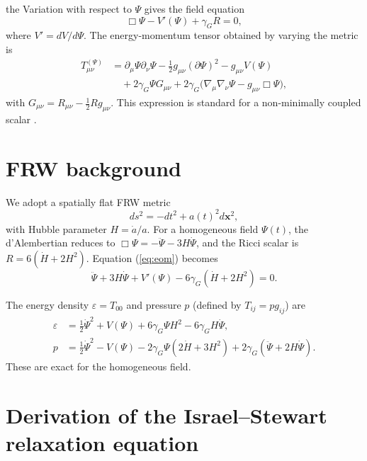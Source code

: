 \documentclass[aps,prd,reprint,superscriptaddress,floatfix]{revtex4-2}
\begin{document}
the Variation with respect to $\Psi$ gives the field equation
\begin{equation}
\Box\Psi - V'(\Psi) + \gamma_G R = 0,
\label{eq:eom}
\end{equation}
where $V' = dV/d\Psi$. The energy-momentum tensor obtained by varying the metric is
\begin{equation}
\begin{aligned}
T_{\mu\nu}^{(\Psi)} &= \partial_\mu\Psi\partial_\nu\Psi - \frac12 g_{\mu\nu}(\partial\Psi)^2 - g_{\mu\nu}V(\Psi) \\
&\quad + 2\gamma_G\Psi G_{\mu\nu} + 2\gamma_G\big( \nabla_\mu\nabla_\nu\Psi - g_{\mu\nu}\Box\Psi \big),
\label{eq:Tmunu}
\end{aligned}
\end{equation}
with $G_{\mu\nu}=R_{\mu\nu}-\frac12R g_{\mu\nu}$. This expression is standard for a non-minimally coupled scalar \cite{BirrellDavies}.

\section{FRW background}
\label{sec:frw}

We adopt a spatially flat FRW metric
\begin{equation}
ds^2 = -dt^2 + a(t)^2 d\mathbf{x}^2,
\end{equation}
with Hubble parameter $H = \dot{a}/a$. For a homogeneous field $\Psi(t)$, the d'Alembertian reduces to $\Box\Psi = -\ddot\Psi - 3H\dot\Psi$, and the Ricci scalar is $R = 6(\dot H + 2H^2)$. Equation (\ref{eq:eom}) becomes
\begin{equation}
\ddot\Psi + 3H\dot\Psi + V'(\Psi) - 6\gamma_G(\dot H + 2H^2) = 0.
\label{eq:Psi-frw}
\end{equation}

The energy density $\varepsilon = T_{00}$ and pressure $p$ (defined by $T_{ij}=p g_{ij}$) are
\begin{align}
\varepsilon &= \frac12\dot\Psi^2 + V(\Psi) + 6\gamma_G\Psi H^2 - 6\gamma_G H\dot\Psi, \label{eq:energy}\\
p &= \frac12\dot\Psi^2 - V(\Psi) - 2\gamma_G\Psi(2\dot H+3H^2) + 2\gamma_G(\ddot\Psi+2H\dot\Psi). \label{eq:pressure}
\end{align}
These are exact for the homogeneous field.

\section{Derivation of the Israel--Stewart relaxation equation}
\label{sec:israel}
\end{document}
